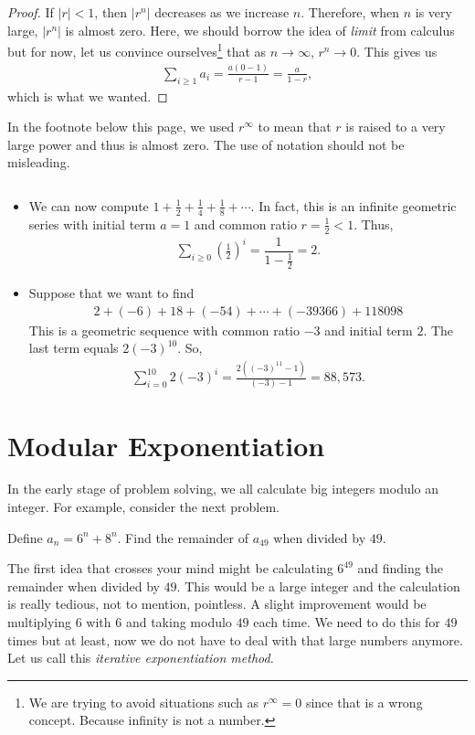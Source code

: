 \documentclass{subfile}
\begin{document}
		\begin{proof}
			If $|r|<1$, then $|r^n|$ decreases as we increase $n$. Therefore, when $n$ is very large, $|r^n|$ is almost zero. Here, we should borrow the idea of \textit{limit} from calculus but for now, let us convince ourselves\footnote{We are trying to avoid situations such as $r^\infty=0$ since that is a wrong concept. Because infinity is not a number.} that as $n\to\infty$, $r^n\to0$. This gives us
				\begin{align*}
					\sum_{i\geq1} a_i = \frac{a \left(0-1\right)}{r-1}= \frac{a}{1-r},
				\end{align*}
			which is what we wanted.
		\end{proof}
		
		\begin{note}
			In the footnote below this page, we used $r^{\infty}$ to mean that $r$ is raised to a very large power and thus is almost zero. The use of notation should not be misleading.
		\end{note}
		
		\begin{example}
		$ $
			\begin{itemize}
				\item We can now compute $\displaystyle 	1 + \frac{1}{2}+ \frac{1}{4}+\frac{1}{8}+ \cdots$. In fact, this is an infinite geometric series with initial term $a=1$ and common ratio $r=\frac{1}{2}<1$. Thus,
					\begin{align*}
						\sum_{i\geq0} \left(\frac{1}{2}\right)^i = \dfrac{1}{1-\frac{1}{2}} = 2.
					\end{align*}
				\item Suppose that we want to find
					\begin{align*}
						2 + (-6) + 18 + (-54) + \cdots + (-39366) + 118098
					\end{align*}
				This is a geometric sequence with common ratio $-3$ and initial term $2$. The last term equals $2(-3)^{10}$. So,
					\begin{align*}
						\sum_{i=0}^{10} 2(-3)^{i} = \frac{2 \left((-3)^{11} -1\right)}{(-3) - 1} = 88,573.
					\end{align*}
			\end{itemize}
		\end{example}
	\section{Modular Exponentiation} \label{modexponent}
	In the early stage of problem solving, we all calculate big integers modulo an integer. For example, consider the next problem.
		\begin{problem}
			Define $a_n=6^n+8^n$. Find the remainder of $a_{49}$ when divided by $49$.
		\end{problem}
	The first idea that crosses your mind might be calculating $6^{49}$ and finding the remainder when divided by $49$. This would be a large integer and the calculation is really tedious, not to mention, pointless. A slight improvement would be multiplying $6$ with $6$ and taking modulo $49$ each time. We need to do this for $49$ times but at least, now we do not have to deal with that large numbers anymore. Let us call this \textit{iterative exponentiation method}.
	
\end{document}

